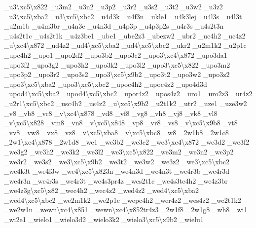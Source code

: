 {\-\_\-u3\textbackslash{}xc5\textbackslash{}x822 \-\_\-u3m2 \-\_\-u3n2 \-\_\-u3p2 \-\_\-u3r2 \-\_\-u3s2 \-\_\-u3t2 \-\_\-u3w2 \-\_\-u3z2 \-\_\-u3\textbackslash{}xc5\textbackslash{}xba2 \-\_\-u3\textbackslash{}xc5\textbackslash{}xbc2 \-\_\-u4d3k \-\_\-u4f3n \-\_\-ukle1 \-\_\-u4k3lej \-\_\-u4l3s \-\_\-u4l3t \-\_\-u2m1b \-\_\-u4m3br \-\_\-u4n3c \-\_\-u4n3d \-\_\-u4p3p \-\_\-u4p3p2s \-\_\-u4r3s \-\_\-u4s2t3n \-\_\-u4s2t1c \-\_\-u4s2t1k \-\_\-u4z3be1 \-\_\-ube1 \-\_\-ube2z3 \-\_\-ubezw2 \-\_\-ubr2 \-\_\-uc4h2 \-\_\-uc4z2 \-\_\-u\textbackslash{}xc4\textbackslash{}x872 \-\_\-ud4z2 \-\_\-ud4\textbackslash{}xc5\textbackslash{}xba2 \-\_\-ud4\textbackslash{}xc5\textbackslash{}xbc2 \-\_\-ukr2 \-\_\-u2m1k2 \-\_\-u2p1c \-\_\-upc4h2 \-\_\-upo1 \-\_\-upo2d2 \-\_\-upo3b2 \-\_\-upo3c2 \-\_\-upo3\textbackslash{}xc4\textbackslash{}x872 \-\_\-upo3da1 \-\_\-upo3f2 \-\_\-upo3g2 \-\_\-upo3h2 \-\_\-upo3k2 \-\_\-upo3l2 \-\_\-upo3\textbackslash{}xc5\textbackslash{}x822 \-\_\-upo3m2 \-\_\-upo3p2 \-\_\-upo3r2 \-\_\-upo3s2 \-\_\-upo3\textbackslash{}xc5\textbackslash{}x9b2 \-\_\-upo3t2 \-\_\-upo3w2 \-\_\-upo3z2 \-\_\-upo3\textbackslash{}xc5\textbackslash{}xba2 \-\_\-upo3\textbackslash{}xc5\textbackslash{}xbc2 \-\_\-upoc4h2 \-\_\-upoc4z2 \-\_\-upo4d3d \-\_\-upod4\textbackslash{}xc5\textbackslash{}xba2 \-\_\-upod4\textbackslash{}xc5\textbackslash{}xbc2 \-\_\-upor4z2 \-\_\-upos4z2 \-\_\-uro1 \-\_\-uro2z3 \-\_\-ur4z2 \-\_\-u2r1\textbackslash{}xc5\textbackslash{}xbc2 \-\_\-usc4h2 \-\_\-us4z2 \-\_\-u\textbackslash{}xc5\textbackslash{}x9b2 \-\_\-u2t1k2 \-\_\-utr2 \-\_\-uze1 \-\_\-uze3w2 \-\_\-v8 \-\_\-vb8 \-\_\-vc8 \-\_\-v\textbackslash{}xc4\textbackslash{}x878 \-\_\-vd8 \-\_\-vf8 \-\_\-vg8 \-\_\-vh8 \-\_\-vj8 \-\_\-vk8 \-\_\-vl8 \-\_\-v\textbackslash{}xc5\textbackslash{}x828 \-\_\-vm8 \-\_\-vn8 \-\_\-v\textbackslash{}xc5\textbackslash{}x848 \-\_\-vp8 \-\_\-vr8 \-\_\-vs8 \-\_\-v\textbackslash{}xc5\textbackslash{}x9b8 \-\_\-vt8 \-\_\-vv8 \-\_\-vw8 \-\_\-vx8 \-\_\-vz8 \-\_\-v\textbackslash{}xc5\textbackslash{}xba8 \-\_\-v\textbackslash{}xc5\textbackslash{}xbc8 \-\_\-w8 \-\_\-2w1b8 \-\_\-2w1c8 \-\_\-2w1\textbackslash{}xc4\textbackslash{}x878 \-\_\-2w1d8 \-\_\-we1 \-\_\-we3b2 \-\_\-we3c2 \-\_\-we3\textbackslash{}xc4\textbackslash{}x872 \-\_\-we3d2 \-\_\-we3f2 \-\_\-we3g2 \-\_\-we3h2 \-\_\-we3k2 \-\_\-we3l2 \-\_\-we3\textbackslash{}xc5\textbackslash{}x822 \-\_\-we3m2 \-\_\-we3n2 \-\_\-we3p2 \-\_\-we3r2 \-\_\-we3s2 \-\_\-we3\textbackslash{}xc5\textbackslash{}x9b2 \-\_\-we3t2 \-\_\-we3w2 \-\_\-we3z2 \-\_\-we3\textbackslash{}xc5\textbackslash{}xbc2 \-\_\-we4k3t \-\_\-we4l3w \-\_\-we4\textbackslash{}xc5\textbackslash{}x823n \-\_\-we4n3d \-\_\-we4n3t \-\_\-we4r3b \-\_\-we4r3d \-\_\-we4r3n \-\_\-we4r3s \-\_\-we4r3t \-\_\-we4s3pr4z \-\_\-wes2t1c \-\_\-we4s3tc4h2 \-\_\-we4z3br \-\_\-we4z3g\textbackslash{}xc5\textbackslash{}x82 \-\_\-wec4h2 \-\_\-wec4z2 \-\_\-wed4z2 \-\_\-wed4\textbackslash{}xc5\textbackslash{}xba2 \-\_\-wed4\textbackslash{}xc5\textbackslash{}xbc2 \-\_\-we2m1k2 \-\_\-we2p1c \-\_\-wepc4h2 \-\_\-wer4z2 \-\_\-wes4z2 \-\_\-we2t1k2 \-\_\-we2w1n \-\_\-wewn\textbackslash{}xc4\textbackslash{}x851 \-\_\-wewn\textbackslash{}xc4\textbackslash{}x852tr4z3 \-\_\-2w1f8 \-\_\-2w1g8 \-\_\-wh8 \-\_\-wi1 \-\_\-wi2e1 \-\_\-wielo1 \-\_\-wielo3d2 \-\_\-wielo3k2 \-\_\-wielo3\textbackslash{}xc5\textbackslash{}x9b2 \-\_\-wielu1 }

